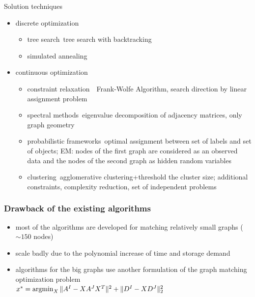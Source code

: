 \documentclass[handout]{beamer}
\def\argmin{\mathop{\rm argmin}}						%
\begin{document}
\begin{frame} [allowframebreaks]
\framebreak

Solution techniques
\begin{itemize}
\item discrete optimization
	\begin{itemize}
	\item tree search~{\tiny tree search with backtracking}
	\item simulated annealing~{\tiny}
	\end{itemize} 
\item continuous optimization
	\begin{itemize}
		\item constraint relaxation~{\tiny\ Frank-Wolfe Algorithm, search direction by linear assignment problem}
		\item spectral methods~{\tiny eigenvalue decomposition of adjacency matrices, only graph geometry}
		\item probabilistic frameworks~{\tiny optimal assignment between set of labels and set of objects; EM: nodes
				of the first graph are considered as an observed data and the nodes of the second
				graph as hidden random variables}
		\item clustering~{\tiny agglomerative clustering+threshold the cluster size; additional constraints, complexity reduction, set of independent problems}
	\end{itemize} 
\end{itemize}
\end{frame}
\begin{frame}
\frametitle{Drawback of the existing algorithms}

\begin{itemize}
\item most of the algorithms are developed for matching relatively small graphs ($\sim 150$ nodes)
\item scale badly due to the polynomial increase of time and storage demand
\item algorithms for the big graphs use another formulation of the graph matching optimization problem\\
\vspace{5pt}
{\centering
$x^* = \argmin_{X}\|A^I-XA^JX^T\|^2+\|D^I-XD^J\|^2_2$}
\end{itemize}

\end{frame}
\end{document}
